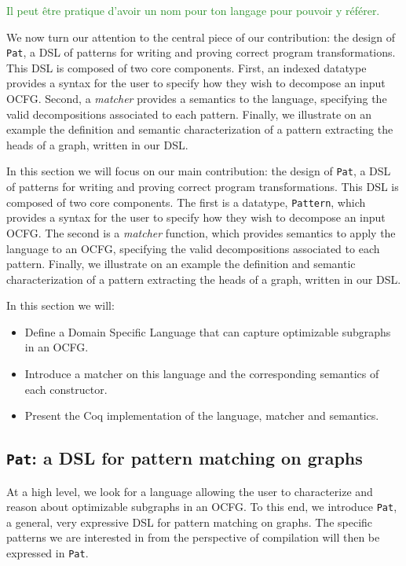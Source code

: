 \documentclass[11pt]{article}
\newcommand{\inlinecoq}[1]{\mbox{\lstinline[style=customcoq,columns=fixed,basewidth=.48em]{#1}}}
\newcommand{\ilc}[1]{\inlinecoq{#1}}
\newcommand{\yz}[1]{\textcolor{ForestGreen}{#1}}
\newcommand{\yzt}[1]{\textcolor{ForestGreen!50}{#1}}
\newcommand{\cut}[1]{\textcolor{Gray!40}{#1}}
\newcommand{\ocfg}{OCFG\xspace}
\newcommand{\pat}{\texttt{Pat}\xspace}
\begin{document}
\yz{Il peut être pratique d'avoir un nom pour ton langage pour pouvoir y référer.}

\yzt{We now turn our attention to the central piece of our contribution: the design of \pat{}, a DSL of patterns for writing and proving correct program transformations. This DSL is composed of two core components. First, an indexed datatype provides a syntax for the user to specify how they wish to decompose an input \ocfg. Second, a \emph{matcher} provides a semantics to the language, specifying the valid decompositions associated to each pattern. Finally, we illustrate on an example the definition and semantic characterization of a pattern extracting the heads of a graph, written in our DSL.}

In this section we will focus on our main contribution: the design of \pat{}, a DSL of patterns for writing and proving correct program transformations. This DSL is composed of two core components. The first is a datatype, \ilc{Pattern}, which provides a syntax for the user to specify how they wish to decompose an input \ocfg. The second is a \emph{matcher} function, which provides semantics to apply the language to an \ocfg{}, specifying the valid decompositions associated to each pattern. Finally, we illustrate on an example the definition and semantic characterization of a pattern extracting the heads of a graph, written in our DSL\@.

\cut{
In this section we will:\begin{itemize}
  \item Define a Domain Specific Language that can capture optimizable subgraphs in an \ocfg\@.
  \item Introduce a matcher on this language and the corresponding semantics of each constructor.
  \item Present the Coq implementation of the language, matcher and semantics.
\end{itemize}
}

\subsection{\pat: a DSL for pattern matching on graphs}

\yzt{At a high level, we look for a language allowing the user to characterize and reason about optimizable subgraphs in an \ocfg. 
To this end, we introduce \pat, a general, very expressive DSL for pattern matching on graphs. The specific patterns we are interested in from the perspective of compilation will then be expressed in \pat.}
\end{document}

